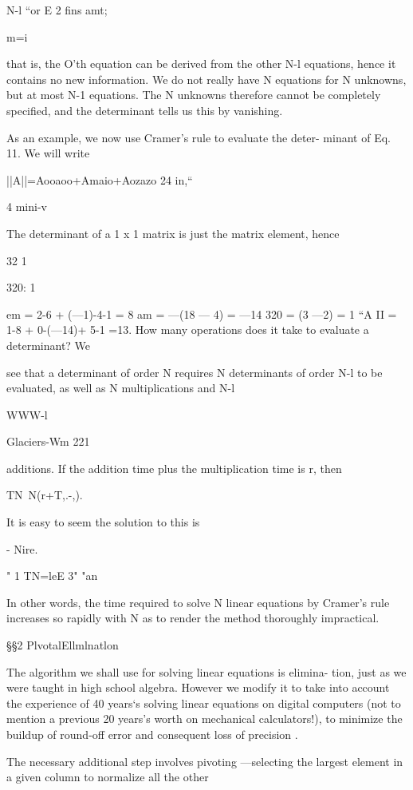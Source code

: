{N-l
“or E 2 ﬁns amt;

m=i

that is, the O’th equation can be derived from the other N-l
equations, hence it contains no new information. We do not really
have N equations for N unknowns, but at most N-1 equations. The
N unknowns therefore cannot be completely speciﬁed, and the
determinant tells us this by vanishing.

As an example, we now use Cramer’s rule to evaluate the deter-
minant of Eq. 11. We will write

||A||=Aooaoo+Amaio+Aozazo
24
in,“

4
mini-v

The determinant of a 1 x 1 matrix is just the matrix element, hence

32
1

320: 1

 

 

 

em = 2-6 + (—1)-4-1 = 8
am = —(18 — 4) = —14
320 = (3 —2) = 1
“A II = 1-8 + 0-(—14)+ 5-1 =13.
How many operations does it take to evaluate a determinant? We

see that a determinant of order N requires N determinants of
order N-l to be evaluated, as well as N multiplications and N-l

WWW-l

Glaciers-Wm 221

additions. If the addition time plus the multiplication time is r,
then

TN~N(r+T,.-,).

It is easy to seem the solution to this is

- Nire.

" 1
TN=leE 3" "an

In other words, the time required to solve N linear equations by
Cramer’s rule increases so rapidly with N as to render the method
thoroughly impractical.

§§2 PlvotalEllmlnatlon

The algorithm we shall use for solving linear equations is elimina-
tion, just as we were taught in high school algebra. However we
modify it to take into account the experience of 40 years‘s solving
linear equations on digital computers (not to mention a previous
20 years's worth on mechanical calculators!), to minimize the
buildup of round-off error and consequent loss of precision .

The necessary additional step involves pivoting —selecting the
largest element in a given column to normalize all the other

}
